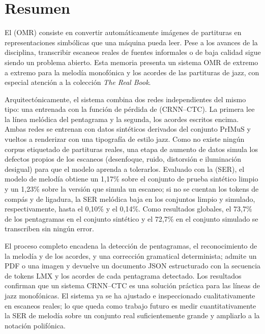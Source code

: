 \chapter*{Resumen}

El  (OMR) consiste en convertir automáticamente
imágenes de partituras en representaciones simbólicas que una máquina pueda leer. Pese a
los avances de la disciplina, transcribir escaneos reales de fuentes informales o de baja
calidad sigue siendo un problema abierto. Esta memoria presenta un sistema OMR de extremo
a extremo para la melodía monofónica y los acordes de las partituras de jazz, con especial
atención a la colección \textit{The Real Book}.

Arquitectónicamente, el sistema combina dos redes independientes del mismo tipo: una
 entrenada con la función de pérdida de
 (CRNN--CTC). La primera lee la línea melódica del
pentagrama y la segunda, los acordes escritos encima. Ambas redes se entrenan con datos sintéticos
derivados del conjunto PrIMuS y vueltos a renderizar con una tipografía de estilo jazz. Como
no existe ningún corpus etiquetado de partituras reales, una etapa de aumento de datos simula
los defectos propios de los escaneos (desenfoque, ruido, distorsión e iluminación desigual)
para que el modelo aprenda a tolerarlos. Evaluado con la 
(SER), el modelo de melodía obtiene un 1{,}17\% sobre el conjunto de prueba sintético limpio
y un 1{,}23\% sobre la versión que simula un escaneo; si no se cuentan los tokens de compás y
de ligadura, la SER melódica baja en los conjuntos limpio y simulado, respectivamente, hasta el
0{,}10\% y el 0{,}14\%.
Como resultados globales, el 73{,}7\% de los pentagramas en el conjunto sintético y el 72{,}7\%
en el conjunto simulado se transcriben sin ningún error.

El proceso completo encadena la detección de pentagramas, el reconocimiento de la melodía y
de los acordes, y una corrección gramatical determinista; admite un PDF o una imagen y
devuelve un documento JSON estructurado con la secuencia de tokens LMX y los acordes de cada
pentagrama detectado. Los resultados confirman que un sistema CRNN--CTC es una solución
práctica para las líneas de jazz monofónicas. El sistema ya se ha ajustado e inspeccionado
cualitativamente en escaneos reales; lo que queda como trabajo futuro es medir cuantitativamente
la SER de melodía sobre un conjunto real suficientemente grande y ampliarlo a la notación
polifónica.

